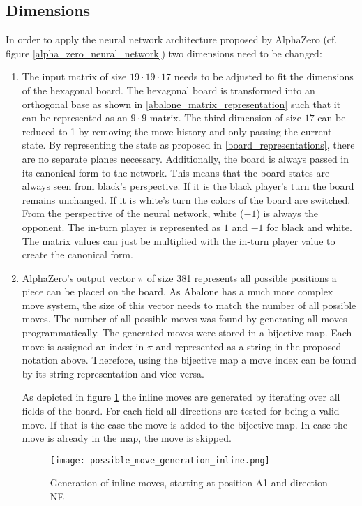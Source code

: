 \subsection{Dimensions}
In order to apply the neural network architecture proposed by AlphaZero (cf. figure \ref{alpha_zero_neural_network}) two dimensions need to be changed:
\begin{enumerate}
    \item The input matrix of size $19 \cdot 19 \cdot 17$ needs to be adjusted to fit the dimensions of the hexagonal board. The hexagonal board is transformed into an orthogonal base as shown in \ref{abalone_matrix_representation} such that it can be represented as an $9 \cdot 9$ matrix.
          The third dimension of size $17$ can be reduced to 1 by removing the move history and only passing the current state. By representing the state as proposed in \ref{board_representations}, there are no separate planes necessary. Additionally, the board is always passed in its canonical form to the network. This means that the board states are always seen from black's perspective. If it is the black player's turn the board remains unchanged. If it is white's turn the colors of the board are switched. From the perspective of the neural network, white ($-1$) is always the opponent. The in-turn player is represented as $1$ and $-1$ for black and white. The matrix values can just be multiplied with the in-turn player value to create the canonical form.
    \item AlphaZero's output vector $\pi$ of size 381 represents all possible positions a piece can be placed on the board. As Abalone has a much more complex move system, the size of this vector needs to match the number of all possible moves. The number of all possible moves was found by generating all moves programmatically. The generated moves were stored in a bijective map. Each move is assigned an index in $\pi$ and represented as a string in the proposed notation above. Therefore, using the bijective map a move index can be found by its string representation and vice versa.

          As depicted in figure \ref{possible_move_generation_inline} the inline moves are generated by iterating over all fields of the board. For each field all directions are tested for being a valid move. If that is the case the move is added to the bijective map. In case the move is already in the map, the move is skipped.

          \begin{figure}
              \centering
              \texttt{[image: possible\_move\_generation\_inline.png]}
              \caption{Generation of inline moves, starting at position A1 and direction NE}
              \label{possible_move_generation_inline}
          \end{figure}


\end{enumerate}
